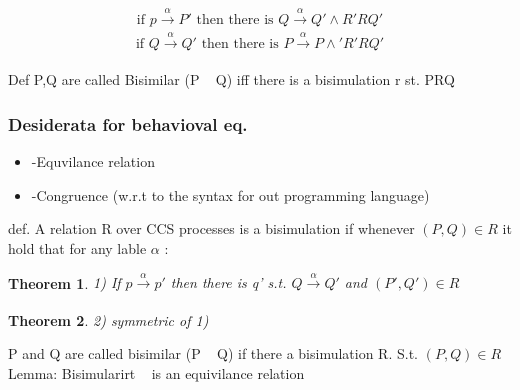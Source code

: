 \documentclass[a4paper,10pt,titlepage]{report}
\newtheorem{theorem}{Theorem}
\begin{document}
	\begin{equation}
		\text{if } p  \xrightarrow[\text{}]{{ \alpha }} P' \text{ then there is } Q  \xrightarrow[\text{}]{{ \alpha }} Q' \wedge R'RQ'
	\end{equation}
	\begin{equation}
	\text{if }Q  \xrightarrow[\text{}]{{ \alpha }} Q' \text{ then there is } P  \xrightarrow[\text{}]{{ \alpha }} P \wedge ' R'RQ'
	\end{equation}


Def P,Q are called Bisimilar (P ~ Q) iff there is a bisimulation r st. PRQ


\subsubsection{Desiderata for behavioval eq.}

\begin{itemize}
\item -Equvilance relation

\item -Congruence (w.r.t to the syntax for out programming language)
\end{itemize}


def. A relation R over CCS processes is a bisimulation if whenever $(P,Q) \in R$ it hold that for any lable $\alpha$ :
\begin{theorem}
1) If $p \xrightarrow[\text{}]{{ \alpha}} p'$ then there is q' s.t. $Q \xrightarrow[\text{}]{{ \alpha}} Q'$ and $(P',Q') \in R$
\end{theorem}
\begin{theorem}
2) symmetric of 1)
\end{theorem}


P and Q are called bisimilar (P ~ Q) if there a bisimulation R. S.t. $(P, Q) \in R$ \\


Lemma: Bisimularirt ~ is an equivilance relation\\
\end{document}
